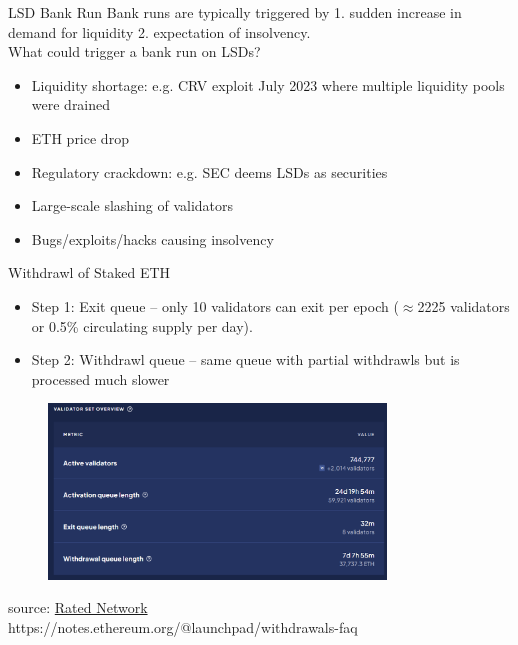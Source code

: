 \documentclass{beamer}
\begin{document}
\begin{frame}{LSD Bank Run}
    Bank runs are typically triggered by 1. sudden increase in demand for liquidity 2. expectation of insolvency.\\  
    \bigskip
    What could trigger a bank run on LSDs?
    \begin{itemize}
        \item Liquidity shortage: e.g. CRV exploit July 2023 where multiple liquidity pools were drained
        \item ETH price drop
        \item Regulatory crackdown: e.g. SEC deems LSDs as securities
        \item Large-scale slashing of validators
        \item Bugs/exploits/hacks causing insolvency
    \end{itemize}
\end{frame}

\begin{frame}{Withdrawl of Staked ETH}
    \begin{itemize}
        \item Step 1: Exit queue -- only 10 validators can exit per epoch ($\approx$2225 validators or 0.5\% circulating supply per day).
        \item Step 2: Withdrawl queue -- same queue with partial withdrawls but is processed much slower
    \end{itemize}
    \begin{figure}
        \centering
        \includegraphics[width=0.8\textwidth]{figures/rated_queues.png}
    \end{figure}
    \tiny{source: \href{https://www.rated.network/overview?network=mainnet&timeWindow=30d&rewardsMetric=average}{Rated Network}}\\
    https://notes.ethereum.org/@launchpad/withdrawals-faq
\end{frame}
\end{document}
